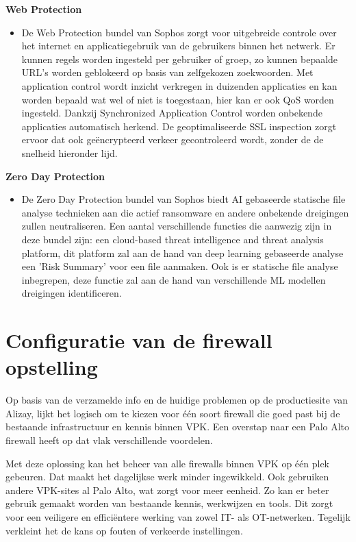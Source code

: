 \textbf{Web Protection}
\begin{itemize}[label=\textbullet]
    \item De Web Protection bundel van Sophos zorgt voor uitgebreide controle over het internet en applicatiegebruik van de gebruikers binnen het netwerk. Er kunnen regels worden ingesteld per gebruiker of groep, zo kunnen bepaalde URL's worden geblokeerd op basis van zelfgekozen zoekwoorden. Met application control wordt inzicht verkregen in duizenden applicaties en kan worden bepaald wat wel of niet is toegestaan, hier kan er ook QoS worden ingesteld. Dankzij Synchronized Application Control worden onbekende applicaties automatisch herkend. De geoptimaliseerde SSL inspection zorgt ervoor dat ook geëncrypteerd verkeer gecontroleerd wordt, zonder de de snelheid hieronder lijd.
\end{itemize}

\textbf{Zero Day Protection}
\begin{itemize}[label=\textbullet]
    \item De Zero Day Protection bundel van Sophos biedt AI gebaseerde statische file analyse technieken aan die actief ransomware en andere onbekende dreigingen zullen neutraliseren. Een aantal verschillende functies die aanwezig zijn in deze bundel zijn: een cloud-based threat intelligence and threat analysis platform, dit platform zal aan de hand van deep learning gebaseerde analyse een 'Risk Summary' voor een file aanmaken. Ook is er statische file analyse inbegrepen, deze functie zal aan de hand van verschillende ML modellen dreigingen identificeren.
\end{itemize}








\chapter{Configuratie van de firewall opstelling}
\label{ch:configFW}

Op basis van de verzamelde info en de huidige problemen op de productiesite van Alizay, lijkt het logisch om te kiezen voor één soort firewall die goed past bij de bestaande infrastructuur en kennis binnen VPK. Een overstap naar een Palo Alto firewall heeft op dat vlak verschillende voordelen.

Met deze oplossing kan het beheer van alle firewalls binnen VPK op één plek gebeuren. Dat maakt het dagelijkse werk minder ingewikkeld. Ook gebruiken andere VPK-sites al Palo Alto, wat zorgt voor meer eenheid. Zo kan er beter gebruik gemaakt worden van bestaande kennis, werkwijzen en tools. Dit zorgt voor een veiligere en efficiëntere werking van zowel IT- als OT-netwerken. Tegelijk verkleint het de kans op fouten of verkeerde instellingen.

